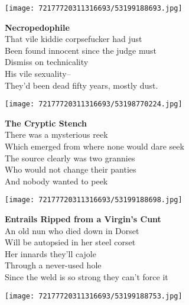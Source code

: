 \documentclass[10pt,letterpaper]{article}
\begin{document}
\begin{center}\texttt{[image: 72177720311316693/53199188693.jpg]}
\end{center}
\begin{center}
\textbf{Necropedophile}\\
\vskip 0.2in
That vile kiddie corpsefucker had just\\
Been found innocent since the judge must\\
Dismiss on technicality\\
His vile sexuality--\\
They'd been dead fifty years, mostly dust.\\
\end{center}
\pagebreak

\begin{center}\texttt{[image: 72177720311316693/53198770224.jpg]}
\end{center}
\begin{center}
\textbf{The Cryptic Stench}\\
\vskip 0.2in
There was a mysterious reek\\
Which emerged from where none would dare seek\\
The source clearly was two grannies\\
Who would not change their panties\\
And nobody wanted to peek\\
\end{center}
\pagebreak

\begin{center}
\texttt{[image: 72177720311316693/53199188698.jpg]}
\end{center}

\begin{center}
\textbf{Entrails Ripped from a Virgin's Cunt}\\
\vskip 0.2in
An old nun who died down in Dorset\\
Will be autopsied in her steel corset\\
Her innards they'll cajole\\
Through a never-used hole\\
Since the weld is so strong they can't force it\\
\end{center}
\pagebreak

\begin{center}
\texttt{[image: 72177720311316693/53199188753.jpg]}
\end{center}
\end{document}
